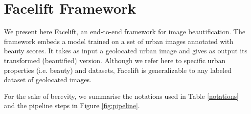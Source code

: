 \section{Facelift Framework}
We present here Facelift, an end-to-end  framework for
 image beautification. The framework embeds a model trained on a set of urban images annotated with beauty scores. It takes as input a geolocated urban image and gives as output its transformed (beautified) version. %
 Although we refer here to specific urban properties (i.e. beauty) and datasets, Facelift is generalizable to any labeled dataset of geolocated images. %

For the sake of berevity, we summarise the notations used in Table \ref{notations} and the pipeline steps in Figure \ref{fig:pipeline}. 


